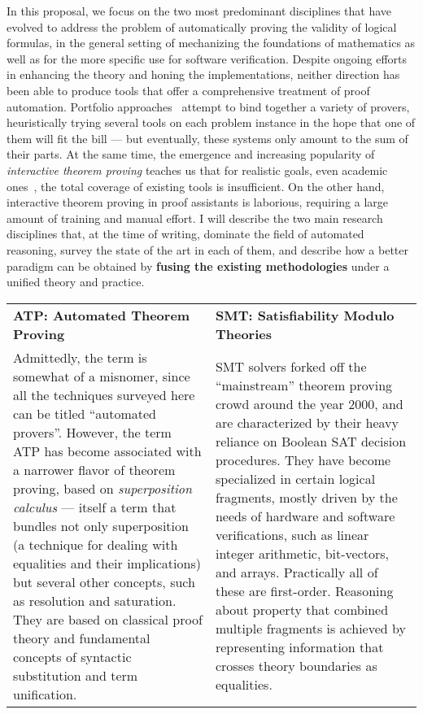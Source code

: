 In this proposal, we focus on the two most predominant disciplines that have evolved to address the problem of automatically proving the validity of logical formulas, in the general setting of mechanizing the foundations of mathematics as well as for the more specific use for software verification.
Despite ongoing efforts in enhancing the theory and honing the implementations, neither direction has been able to produce tools that offer a comprehensive treatment of proof automation.
Portfolio approaches~\cite{ESOP2013:Filliatre} attempt to bind together a variety of provers, heuristically trying several tools on each problem instance in the hope that one of them will fit the bill ---
but eventually, these systems only amount to the sum of their parts.
At the same time, the emergence and increasing popularity of \emph{interactive theorem proving} teaches us that for realistic goals, even academic ones~\cite{DeepSpec}, the total coverage of existing tools is insufficient.
On the other hand, interactive theorem proving in proof assistants is laborious, requiring a large amount of training and manual effort.
I will describe the two main research disciplines that, at the time of writing, dominate the field of automated reasoning, survey the state of the art in each of them, and describe how a better paradigm can be obtained by \textbf{fusing the existing methodologies} under a unified theory and practice.

\vspace{5pt}\noindent
\begin{tabular}{p{8cm}p{8cm}}
\textbf{ATP: Automated Theorem Proving} &
\textbf{SMT: Satisfiability Modulo Theories} \\
Admittedly, the term is somewhat of a misnomer, since all the techniques surveyed here can be titled ``automated provers''.
However, the term ATP has become associated with a narrower flavor of theorem proving, based on \emph{superposition calculus} --- itself a term that bundles not only superposition (a technique for dealing with equalities and their implications) but several other concepts, such as resolution and saturation.
They are based on classical proof theory and fundamental concepts of syntactic substitution and term unification.
&
SMT solvers forked off the ``mainstream'' theorem proving crowd around the year 2000,
and are characterized by their heavy reliance on Boolean SAT decision procedures.
They have become specialized in certain logical fragments, mostly driven by the needs of hardware and software verifications, such as linear integer arithmetic, bit-vectors, and arrays.
Practically all of these are first-order.
Reasoning about property that combined multiple fragments is achieved by representing information that crosses theory boundaries as equalities.
\end{tabular}


